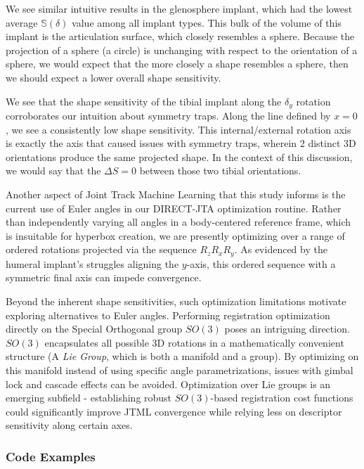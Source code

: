 We see similar intuitive results in the glenosphere implant, which had the lowest average $\mathbb{S}(\delta)$ value among all implant types.
This bulk of the volume of this implant is the articulation surface, which closely resembles a sphere.
Because the projection of a sphere (a circle) is unchanging with respect to the orientation of a sphere, we would expect that the more closely a shape resembles a sphere, then we should expect a lower overall shape sensitivity.

We see that the shape sensitivity of the tibial implant along the $\delta_{y}$ rotation corroborates our intuition about symmetry traps.
Along the line defined by $x=0$, we see a consistently low shape sensitivity.
This internal/external rotation axis is exactly the axis that caused issues with symmetry traps, wherein 2 distinct 3D orientations produce the same projected shape.
In the context of this discussion, we would say that the $\Delta S = 0$ between those two tibial orientations.

Another aspect of Joint Track Machine Learning that this study informs is the current use of Euler angles in our DIRECT-JTA optimization routine.
Rather than independently varying all angles in a body-centered reference frame, which is insuitable for hyperbox creation, we are presently optimizing over a range of ordered rotations projected via the sequence $R_{z}R_{x}R_{y}$.
As evidenced by the humeral implant's struggles aligning the $y$-axis, this ordered sequence with a symmetric final axis can impede convergence.

Beyond the inherent shape sensitivities, such optimization limitations motivate exploring alternatives to Euler angles.
Performing registration optimization directly on the Special Orthogonal group $SO(3)$ poses an intriguing direction.
$SO(3)$ encapsulates all possible 3D rotations in a mathematically convenient structure (A \emph{Lie Group}, which is both a manifold and a group).
By optimizing on this manifold instead of using specific angle parametrizations, issues with gimbal lock and cascade effects can be avoided.
Optimization over Lie groups is an emerging subfield - establishing robust $SO(3)$-based registration cost functions could significantly improve JTML convergence while relying less on descriptor sensitivity along certain axes.

\subsubsection{Code Examples}



